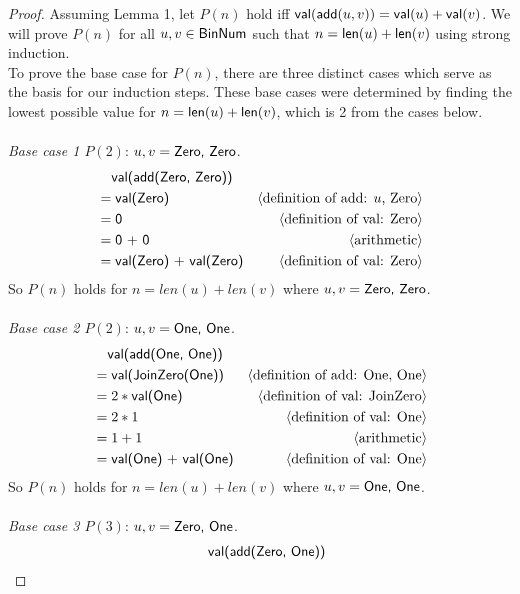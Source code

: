 \documentclass[11pt,fleqn]{article}
\newcommand{\mname}[1]{\mbox{\sf #1}}
\newcommand{\pnote}[1]{{\langle \text{#1} \rangle}}
\begin{document}
  \begin{proof}
    Assuming Lemma 1, let $P(n)$ hold iff $ 
  \mname{val}(\mname{add}(u,v)) = \mname{val}(u) + \mname{val}(v)$.
    We will prove $P(n)$ for all $u,v \in \mname{BinNum}$ such that $n = \mname{len}(u) +
  \mname{len}(v)$ using strong induction.\\
    
    To prove the base case for $P(n)$, there are three distinct cases which serve as the basis for our induction steps. These base cases were determined by finding the lowest possible value for $n = \mname{len}(u) + \mname{len}(v)$, which is 2 from the cases below.\\\\
    \emph{Base case 1 $P(2)$}: $u, v = \mname{Zero, Zero}$.
    \begin{align*}
      &\phantom{{}=} \mname {val(add(Zero, Zero))} \\
      &= \mname{val(Zero)}  & \pnote{definition of add: $u$, Zero}\\
      &= \mname{0}  & \pnote{definition of val: Zero}\\
      &= \mname{0 + 0}  & \pnote{arithmetic}\\
      &= \mname{val(Zero) + val(Zero)}  & \pnote{definition of val: Zero}
    \end{align*}
    So $P(n)$ holds for $n = len(u)+len(v)$ where $u, v  = \mname{Zero, Zero}$.
    \\\\
    \emph{Base case 2 $P(2)$}: $u, v = \mname{One, One}$.
    \begin{align*}
      &\phantom{{}=} \mname {val(add(One, One))} \\
      &= \mname{val(JoinZero(One))}  & \pnote{definition of add: One, One}\\
      &= \mname{$2*\mname{val(One)}$}  & \pnote{definition of val: JoinZero}\\
      &= \mname{$2 * 1$}  & \pnote{definition of val: One}\\
      &= \mname{$1 + 1$}  & \pnote{arithmetic}\\
      &= \mname{val(One) + val(One)}  & \pnote{definition of val: One}
    \end{align*}
    So $P(n)$ holds for $n = len(u)+len(v)$ where $u, v  = \mname{One, One}$.
    \\\\
    \emph{Base case 3 $P(3)$}: $u, v = \mname{Zero, One}$.
    \begin{align*}
      &\phantom{{}=} \mname {val(add(Zero, One))} \\

\end{align*}
\end{proof}
\end{document}
